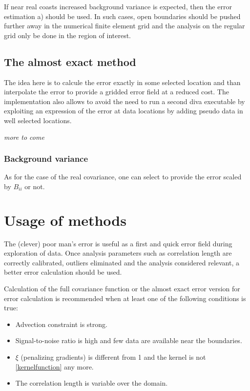 If near real coasts increased background variance is expected, then the error estimation a) should be used. In such cases, open boundaries should be pushed further away in the numerical finite element grid and the analysis on the regular grid only be done in the region of interest.

\subsection{The almost exact method\label{sec:exerr}}

The idea here is to calcule the error exactly in some selected location and than interpolate the error to provide a gridded error field at a reduced cost. The implementation also allows to avoid the need to run a second diva executable by exploiting an expression of the error at data locations by adding pseudo data in well selected locations.

{\it more to come}

\subsubsection{Background variance}

As for the case of the real covariance, one can select to provide the error scaled by $B_{ii}$ or not.


\section{Usage of methods}

The (clever) poor man's error is useful as a first and quick error field during exploration of data. Once analysis parameters such as correlation length are correctly calibrated, outliers eliminated and the analysis considered relevant, a better error calculation should be used.


Calculation of the full covariance function or the almost exact error version for error calculation is recommended when at least one of the following conditions is true:
\begin{itemize}
\item Advection constraint is strong.
\item Signal-to-noise ratio is high and few data are available near the boundaries.
\item $\xi$ (penalizing gradients) is different from 1 and the kernel is not \eqref{kernelfunction} any more. 
\item The correlation length is variable over the domain. 
\end{itemize}

